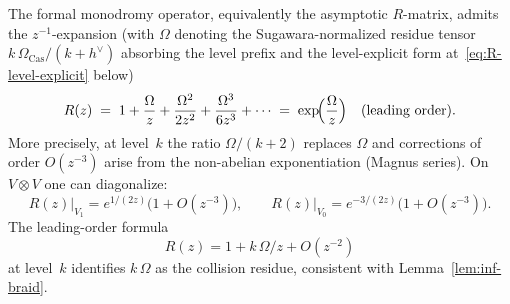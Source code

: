 \begin{computation}
\label{comp:formal-R-expansion}
The formal monodromy operator, equivalently the asymptotic $R$-matrix,
admits the $z^{-1}$-expansion (with $\Omega$ denoting the Sugawara-normalized
residue tensor $k\,\Omega_{\mathrm{Cas}}/(k+h^\vee)$ absorbing the level prefix and the level-explicit form at~\eqref{eq:R-level-explicit} below)
\begin{equation}\label{eq:R-formal-expansion}
 R(z) \;=\; 1 + \frac{\Omega}{z} + \frac{\Omega^2}{2z^2} + \frac{\Omega^3}{6z^3}+\cdots
 \;=\; \exp\!\Bigl(\frac{\Omega}{z}\Bigr)\quad (\text{leading order}).
\end{equation}
More precisely, at level~$k$ the ratio $\Omega/(k+2)$ replaces $\Omega$
and corrections of order $O(z^{-3})$ arise from the non-abelian exponentiation
(Magnus series). On $V\otimes V$ one can diagonalize:
\[
 R(z)\big|_{V_1} = e^{1/(2z)}\bigl(1+O(z^{-3})\bigr),
 \qquad
 R(z)\big|_{V_0} = e^{-3/(2z)}\bigl(1+O(z^{-3})\bigr).
\]
The leading-order formula
\begin{equation}\label{eq:R-level-explicit}
 R(z)=1+k\,\Omega/z+O(z^{-2})
\end{equation}
at level~$k$ identifies $k\,\Omega$ as the collision residue, consistent with
Lemma~\ref{lem:inf-braid}.
\end{computation}

